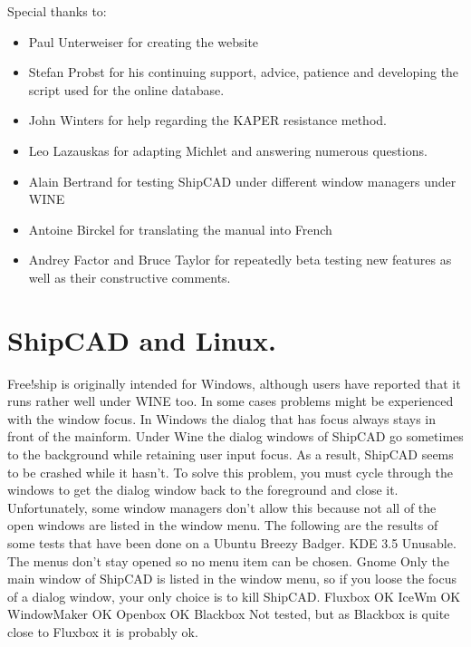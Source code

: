 \documentclass[12pt]{article}
\begin{document}
Special thanks to:
\begin{itemize}
  \item Paul Unterweiser for creating the website
  \item Stefan Probst for his continuing support, advice, patience and developing the script
used for the online database.
  \item John Winters for help regarding the KAPER resistance method.
  \item Leo Lazauskas for adapting Michlet and answering numerous questions.
  \item Alain Bertrand for testing ShipCAD under different window managers under WINE
  \item Antoine Birckel for translating the manual into French
  \item Andrey Factor and Bruce Taylor for repeatedly beta testing new features as well as
their constructive comments.
\end{itemize}

\section{ShipCAD and Linux.}

Free!ship is originally intended for Windows, although users have
reported that it runs rather well under WINE too. In some cases
problems might be experienced with the window focus. In Windows the
dialog that has focus always stays in front of the mainform. Under
Wine the dialog windows of ShipCAD go sometimes to the background
while retaining user input focus. As a result, ShipCAD seems to be
crashed while it hasn't. To solve this problem, you must cycle through
the windows to get the dialog window back to the foreground and close
it. Unfortunately, some window managers don't allow this because not
all of the open windows are listed in the window menu. The following
are the results of some tests that have been done on a Ubuntu Breezy
Badger.  KDE 3.5 Unusable. The menus don't stay opened so no menu item
can be chosen.  Gnome Only the main window of ShipCAD is listed in the
window menu, so if you loose the focus of a dialog window, your only
choice is to kill ShipCAD.  Fluxbox OK IceWm OK WindowMaker OK Openbox
OK Blackbox Not tested, but as Blackbox is quite close to Fluxbox it
is probably ok.
\end{document}
